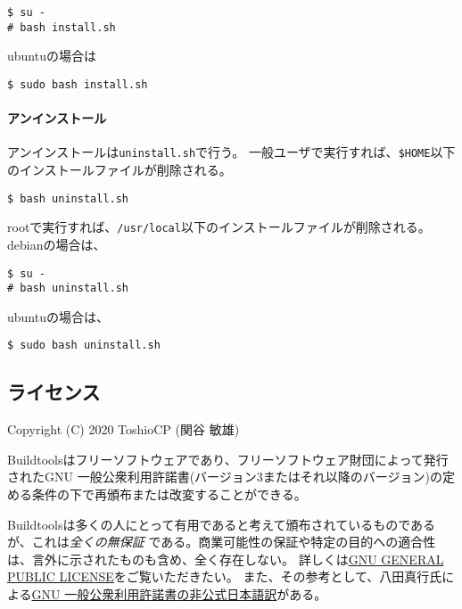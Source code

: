 \begin{verbatim}
$ su -
# bash install.sh
\end{verbatim}

ubuntuの場合は

\begin{verbatim}
$ sudo bash install.sh
\end{verbatim}

\hypertarget{ux30a2ux30f3ux30a4ux30f3ux30b9ux30c8ux30fcux30eb}{%
\paragraph{アンインストール}\label{ux30a2ux30f3ux30a4ux30f3ux30b9ux30c8ux30fcux30eb}}

アンインストールは\texttt{uninstall.sh}で行う。
一般ユーザで実行すれば、\texttt{\$HOME}以下のインストールファイルが削除される。

\begin{verbatim}
$ bash uninstall.sh
\end{verbatim}

rootで実行すれば、\texttt{/usr/local}以下のインストールファイルが削除される。
debianの場合は、

\begin{verbatim}
$ su -
# bash uninstall.sh
\end{verbatim}

ubuntuの場合は、

\begin{verbatim}
$ sudo bash uninstall.sh
\end{verbatim}

\hypertarget{ux30e9ux30a4ux30bbux30f3ux30b9}{%
\subsection{ライセンス}\label{ux30e9ux30a4ux30bbux30f3ux30b9}}

Copyright (C) 2020 ToshioCP (関谷 敏雄)

Buildtoolsはフリーソフトウェアであり、フリーソフトウェア財団によって発行されたGNU
一般公衆利用許諾書(バージョン3またはそれ以降のバージョン)の定める条件の下で再頒布または改変することができる。

Buildtoolsは多くの人にとって有用であると考えて頒布されているものであるが、これは\emph{全くの無保証}
である。商業可能性の保証や特定の目的への適合性は、言外に示されたものも含め、全く存在しない。
詳しくは\href{https://www.gnu.org/licenses/gpl-3.0.html}{GNU GENERAL
PUBLIC LICENSE}をご覧いただきたい。
また、その参考として、八田真行氏による\href{https://gpl.mhatta.org/gpl.ja.html}{GNU
一般公衆利用許諾書の非公式日本語訳}がある。
